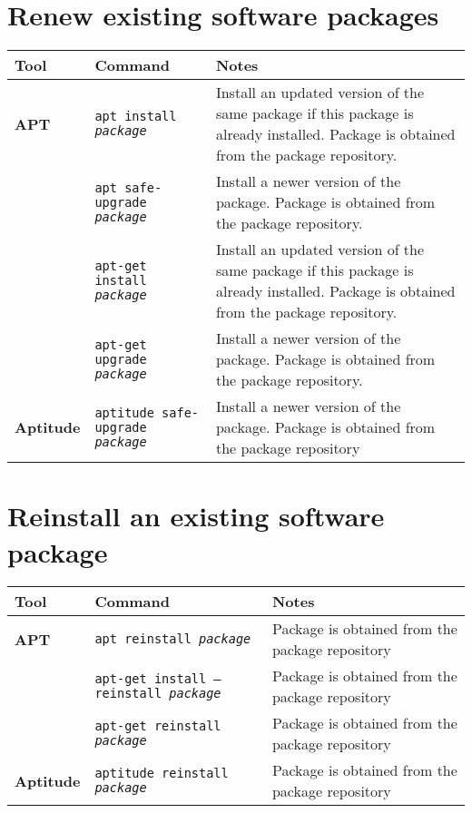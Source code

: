 \documentclass[10pt]{article}
\begin{document}
\section{Renew existing software packages}
\begin{tabular}{ p{3.5cm} p{9cm} p{11cm}}
  \hline
  \rowcolor{Gray}
  \textbf{Tool} & \textbf{Command} & \textbf{Notes} \\
  \hline 
  \textbf{APT} & \texttt{apt install \textit{package}} & Install an updated version of the same package if this package is already installed. Package is obtained from the package repository. \\
  \rowcolor{Gray}
   & \texttt{apt safe-upgrade \textit{package}} &  Install a newer version of the package. Package is obtained from the package repository. \\
   & \texttt{apt-get install \textit{package}} & Install an updated version of the same package if this package is already installed. Package is obtained from the package repository. \\
  \rowcolor{Gray}
   & \texttt{apt-get upgrade \textit{package}} & Install a newer version of the package. Package is obtained from the package repository. \\
  \textbf{Aptitude} & \texttt{aptitude safe-upgrade \textit{package}} & Install a newer version of the package. Package is obtained from the package repository \\
  \hline
\end{tabular}

\newpage

\cheatsheet

\section{Reinstall an existing software package}
\begin{tabular}{ p{3.5cm} p{9cm} p{11cm}}
  \hline
  \rowcolor{Gray}
  \textbf{Tool} & \textbf{Command} & \textbf{Notes} \\
  \hline 
  \textbf{APT} & \texttt{apt reinstall \textit{package}} & Package is obtained from the package repository \\
  \rowcolor{Gray}
  & \texttt{apt-get install --reinstall \textit{package}} & Package is obtained from the package repository \\
  & \texttt{apt-get reinstall \textit{package}} & Package is obtained from the package repository \\
  \rowcolor{Gray}
  \textbf{Aptitude} & \texttt{aptitude reinstall \textit{package}} &Package is obtained from the package repository \\
  \hline
\end{tabular}
\end{document}
